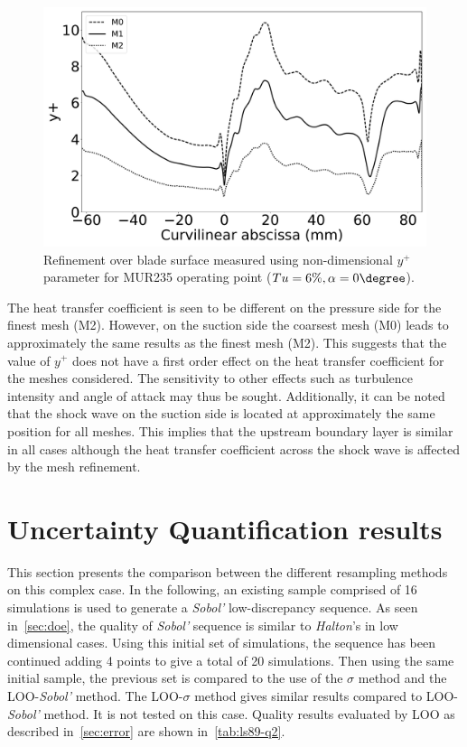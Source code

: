 \begin{figure}[!h]
\centering
\includegraphics[width=0.8\linewidth,keepaspectratio]{fig/applications/ls89/yplus_M0M1M2_comp.pdf}
\caption{Refinement over blade surface measured using non-dimensional $y^+$ parameter for MUR235 operating point ($Tu=6\%, \alpha = 0\degree$).}
\label{fig:M0M1M2_y+comp}
\end{figure}

The heat transfer coefficient is seen to be different on the pressure side for the finest mesh (M2). However, on the suction side the coarsest mesh (M0) leads to approximately the same results as the finest mesh (M2). This suggests that the value of $y^+$ does not have a first order effect on the heat transfer coefficient for the meshes considered. The sensitivity to other effects such as turbulence intensity and angle of attack may thus be sought. Additionally, it can be noted that the shock wave on the suction side is located at approximately the same position for all meshes. This implies that the upstream boundary layer is similar in all cases although the heat transfer coefficient across the shock wave is affected by the mesh refinement.

\section{Uncertainty Quantification results}

This section presents the comparison between the different resampling methods on this complex case. In the following, an existing sample comprised of 16 simulations is used to generate a \textit{Sobol'} low-discrepancy sequence. As seen in~\cref{sec:doe}, the quality of \textit{Sobol'} sequence is similar to \textit{Halton}'s in low dimensional cases. Using this initial set of simulations, the sequence has been continued adding 4 points to give a total of 20 simulations. Then using the same initial sample, the previous set is compared to the use of the $\sigma$ method and the LOO-\textit{Sobol'} method. The LOO-$\sigma$ method gives similar results compared to LOO-\textit{Sobol'} method. It is not tested on this case. Quality results evaluated by LOO as described in~\cref{sec:error} are shown in~\cref{tab:ls89-q2}. 

